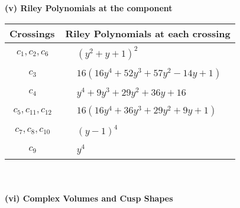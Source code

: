 \documentclass[1p]{elsarticle_modified}
\theoremstyle{definition}
\begin{document}
\newpage\renewcommand{\arraystretch}{1}
\flushleft \textbf{(v) Riley Polynomials at the component}\newline \\
\begin{tabular}{m{50pt}|m{274pt}}
Crossings & \hspace{64pt}Riley Polynomials at each crossing \\
\hline $$\begin{aligned}c_{1},c_{2},c_{6}\end{aligned}$$&$\begin{aligned}
&(y^2+y+1)^2
\end{aligned}$\\
\hline $$\begin{aligned}c_{3}\end{aligned}$$&$\begin{aligned}
&16(16 y^4+52 y^3+57 y^2-14 y+1)
\end{aligned}$\\
\hline $$\begin{aligned}c_{4}\end{aligned}$$&$\begin{aligned}
&y^4+9 y^3+29 y^2+36 y+16
\end{aligned}$\\
\hline $$\begin{aligned}c_{5},c_{11},c_{12}\end{aligned}$$&$\begin{aligned}
&16(16 y^4+36 y^3+29 y^2+9 y+1)
\end{aligned}$\\
\hline $$\begin{aligned}c_{7},c_{8},c_{10}\end{aligned}$$&$\begin{aligned}
&(y-1)^4
\end{aligned}$\\
\hline $$\begin{aligned}c_{9}\end{aligned}$$&$\begin{aligned}
&y^4
\end{aligned}$\\
\hline
\end{tabular}\\~\\
\newpage\flushleft \textbf{(vi) Complex Volumes and Cusp Shapes}
\end{document}
